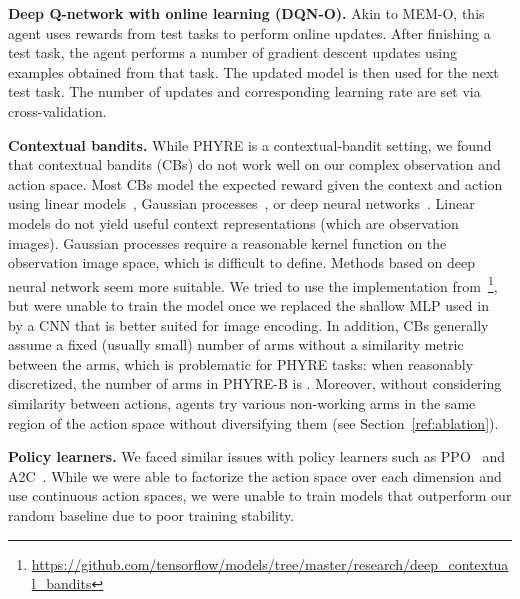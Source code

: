 \documentclass{article}
\begin{document}
\noindent\textbf{Deep Q-network with online learning (DQN-O).} Akin to MEM-O, this agent uses rewards from test tasks to perform online updates. After finishing a test task, the agent performs a number of gradient descent updates using examples obtained from that task. The updated model is then used for the next test task. The number of updates and corresponding learning rate are set via cross-validation.

\noindent\textbf{Contextual bandits.}
While PHYRE is a contextual-bandit setting, we found that contextual bandits (CBs) do not work well on our complex observation and action space.
Most CBs model the expected reward given the context and action using linear models~\cite{chapelle2011empirical,chu2011contextual,li2010contextual}, Gaussian processes~\cite{srinivas2009gaussian}, or deep neural networks~\cite{riquelme2018deep}.
Linear models do not yield useful context representations (which are observation images).
Gaussian processes require a reasonable kernel function on the observation image space, which is difficult to define.
Methods based on deep neural network seem more suitable. We tried to use the implementation from~\cite{riquelme2018deep}\footnote{\scriptsize{\url{https://github.com/tensorflow/models/tree/master/research/deep_contextual_bandits}}}, but were unable to train the model once we replaced the shallow MLP used in~\cite{riquelme2018deep} by a CNN that is better suited for image encoding.
In addition, CBs generally assume a fixed (usually small) number of arms without a similarity metric between the arms, which is problematic for PHYRE tasks: when reasonably discretized, the number of arms in PHYRE-B is .
Moreover, without considering similarity between actions, agents try various non-working arms in the same region of the action space without diversifying them (see Section~\ref{ref:ablation}).

\noindent\textbf{Policy learners.}  We faced similar issues with policy learners such as PPO~\cite{schulman2017ppo} and A2C~\cite{mnih2016a2c}.
While we were able to factorize the action space over each dimension and use continuous action spaces, we were unable to train models that outperform our random baseline due to poor training stability.
\end{document}
